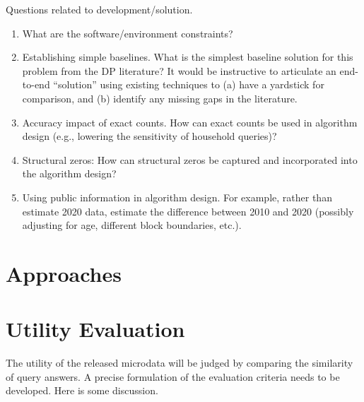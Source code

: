 \documentclass{amsart}
\begin{document}
Questions related to development/solution.
\begin{enumerate}
\item What are the software/environment constraints?
\item Establishing simple baselines.  What is the simplest baseline solution for this problem from the DP literature?  It would be instructive to articulate an end-to-end ``solution'' using existing techniques to (a) have a yardstick for comparison, and (b) identify any missing gaps in the literature. 
\item Accuracy impact of exact counts.  How can exact counts be used in algorithm design (e.g., lowering the sensitivity of household queries)?
\item Structural zeros: How can structural zeros be captured and incorporated into the algorithm design?
\item Using public information in algorithm design.  For example, rather than estimate 2020 data, estimate the difference between 2010 and 2020 (possibly adjusting for age, different block boundaries, etc.).  
\end{enumerate}


\section{Approaches}\label{sec:approaches}



\section{Utility Evaluation} \label{sec:evaluation}

The utility of the released microdata will be judged by comparing the similarity of query answers.  A precise formulation of the evaluation criteria needs to be developed.  Here is some discussion.
\end{document}
